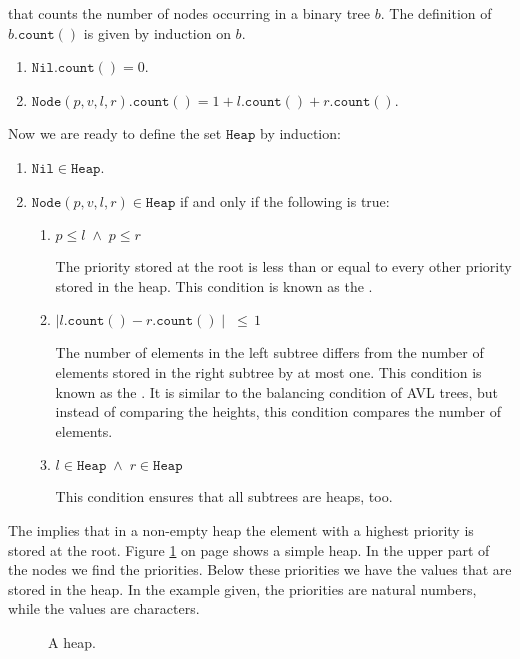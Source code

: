 that counts the number of nodes occurring in a binary tree $b$.  The definition of
$b.\mathtt{count}()$ is given by induction on $b$.
\begin{enumerate}
\item $\mathtt{Nil}.\mathtt{count}() = 0$.
\item $\mathtt{Node}(p,v,l,r).\mathtt{count}() = 1 + l.\mathtt{count}() + r.\mathtt{count}()$.
\end{enumerate}
Now we are ready to define the set $\mathtt{Heap}$ by induction:
\begin{enumerate}
\item $\mathtt{Nil} \in \mathtt{Heap}$.
\item $\mathtt{Node}(p,v,l,r) \in \mathtt{Heap}$ if and only if the following is true:
      \begin{enumerate}
      \item $p \leq l \;\wedge\; p \leq r$

            The priority stored at the root is less than or equal to every other priority stored in
            the heap. This condition is known as the .
      \item $\mid l.\mathtt{count}() - r.\mathtt{count}() \mid \;\leq\, 1$

            The number of elements in the left subtree differs from the number of elements stored in
            the right subtree by at most one.
            This condition is known as the  .  It is similar to the
            balancing condition of AVL trees, but instead of comparing the heights, this condition
            compares the number of elements.
      \item $l \in \mathtt{Heap} \;\wedge\; r \in \mathtt{Heap}$

            This condition ensures that all subtrees are heaps, too.
      \end{enumerate}
\end{enumerate}
The   implies that in a non-empty heap the element with a highest priority is
stored at the root.  Figure \ref{fig:heap-list} on page \pageref{fig:heap-list} shows a simple heap.
In the upper part of the nodes we find the priorities.  Below these priorities we have the values
that are stored in the heap.  In the example given, the priorities are natural numbers, while the
values are characters.


\begin{figure}[!t]
  \centering
  \caption{A heap.}
  \label{fig:heap-list}
\end{figure}

